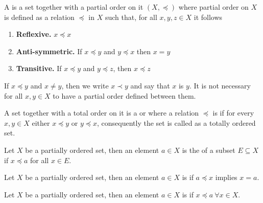 \documentclass[11pt,a4paper]{article}
\begin{document}
\begin{definition}
    A  is a set together with a partial order on it $(X,\preccurlyeq)$ where partial order on $X$ is defined as a relation $\preccurlyeq$ in $X$ such that, for all $x, y, z \in X$ it follows 
    \begin{enumerate}
        \item \textbf{Reflexive.} $x \preccurlyeq x$
        \item \textbf{Anti-symmetric.} If $x \preccurlyeq y$ and $y \preccurlyeq x$ then $x = y$
        \item \textbf{Transitive.} If $x \preccurlyeq y$ and $y \preccurlyeq z$, then $x \preccurlyeq z$
    \end{enumerate}
\end{definition}

\begin{note}
    If $x \preccurlyeq y$ and $x \neq y$, then we write $x \prec y$ and say that $x$ is  $y$. It is not necessary for all $x, y \in X$ to have a partial order defined between them.
\end{note}

\begin{definition}
    A set together with a total order on it is a  or  where a relation $\preccurlyeq$ is  if for every $x, y \in X$ either $x \preccurlyeq y$ or $y \preccurlyeq x$, consequently the set is called as a totally ordered set.
\end{definition}

\begin{definition}
    Let $X$ be a partially ordered set, then an element $a\in X$ is the  of a subset $E\subseteq X$ if $x \preccurlyeq a$ for all $x \in E$.
\end{definition}

\begin{definition}
    Let $X$ be a partially ordered set, then an element $a\in X$ is  if $a \preccurlyeq x$ implies $x = a$.
\end{definition}

\begin{definition}
    Let $X$ be a partially ordered set, then an element $a \in X$ is  if $x \preccurlyeq a\ \forall x \in X$.
\end{definition}
\end{document}
